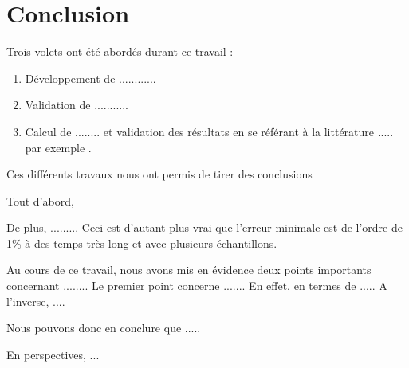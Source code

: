 \documentclass{DChibouti}
\begin{document}

\chapter*{Conclusion}


Trois volets ont été abordés durant ce travail :
\begin{enumerate}
    \item Développement de ............
    \item Validation de ...........
    \item Calcul de ........  et validation des résultats en se référant à la littérature .....  par exemple \cite{TheArt}.
\end{enumerate}

Ces différents travaux nous ont permis de tirer des conclusions 

Tout d’abord, 

De plus, ......... Ceci est d’autant plus vrai que l'erreur minimale est de l'ordre de 1\% à des temps très long et avec plusieurs échantillons.

Au cours de ce travail, nous avons mis en évidence deux points importants concernant
........ Le premier point concerne ....... En effet, en termes de ..... A l’inverse, ....

Nous pouvons donc en conclure que ..... 



En perspectives, ...








\end{document}

